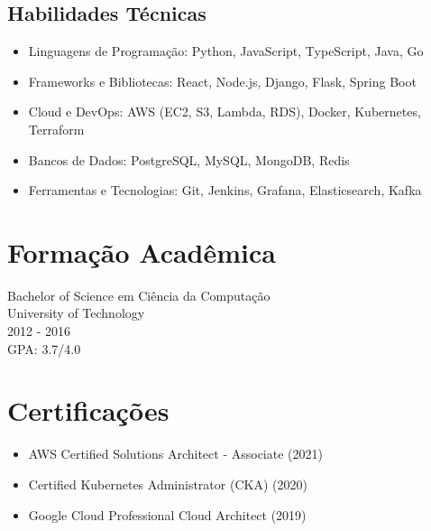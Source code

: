 \documentclass{article}
\begin{document}
\subsection*{Habilidades Técnicas}
\begin{itemize}
    \item Linguagens de Programação: Python, JavaScript, TypeScript, Java, Go
    \item Frameworks e Bibliotecas: React, Node.js, Django, Flask, Spring Boot
    \item Cloud e DevOps: AWS (EC2, S3, Lambda, RDS), Docker, Kubernetes, Terraform
    \item Bancos de Dados: PostgreSQL, MySQL, MongoDB, Redis
    \item Ferramentas e Tecnologias: Git, Jenkins, Grafana, Elasticsearch, Kafka
\end{itemize}

\section*{Formação Acadêmica}
Bachelor of Science em Ciência da Computação \\ University of Technology \\ 2012 - 2016 \\ GPA: 3.7/4.0

\section*{Certificações}
\begin{itemize}
    \item AWS Certified Solutions Architect - Associate (2021)
    \item Certified Kubernetes Administrator (CKA) (2020)
    \item Google Cloud Professional Cloud Architect (2019)
\end{itemize}
\end{document}
